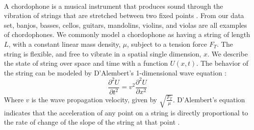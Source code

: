 \documentclass[12pt,letterpaper]{article}
\begin{document}
\paragraph*{}A chordophone is a musical instrument that produces sound through the vibration of strings that are stretched between two fixed points \cite{Hornbostel}. From our data set, banjos, basses, cellos, guitars, mandolins, violins, and violas are all examples of chordophones. We commonly model a chordophone as having a string of length $L$, with a constant linear mass density, $\mu$, subject to a tension force $F_T$. The string is flexible, and free to vibrate in a spatial single dimension, $x$. We describe the state of string over space and time with a function $U(x,t)$. The behavior of the string can be modeled by D'Alembert's 1-dimensional wave equation \cite{Haberman,Hunter,Taylor}:
\begin{equation}
\label{eqn-1DWaveEqn}
\frac{\partial^2 U}{\partial t^2} = v^2 \frac{\partial^2 U}{\partial x^2}
\end{equation}
Where $v$ is the wave propagation velocity, given by $\sqrt{\frac{F_T}{\mu}}$. D'Alembert's equation indicates that the acceleration of any point on a string is directly proportional to the rate of change of the slope of the string at that point \cite{Taylor}. 
\end{document}
